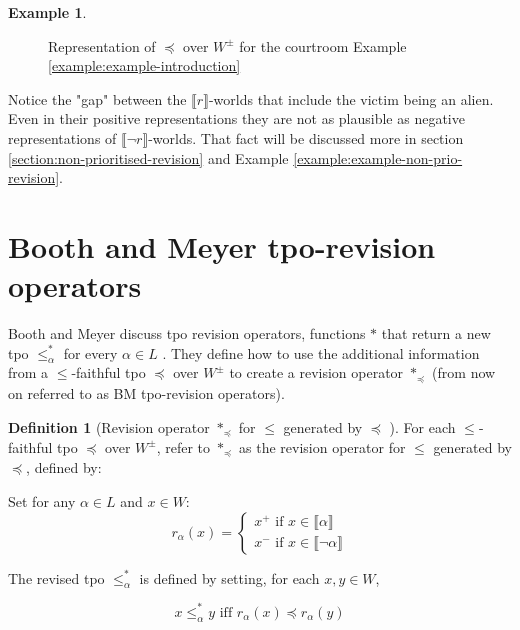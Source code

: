 \documentclass[english, 12pt]{scrartcl}
\theoremstyle{definition}
\newtheorem{example}{Example}
\theoremstyle{definition}
\newtheorem{definition}{Definition}
\theoremstyle{definition}
\newcommand{\modelsOf}[1]{\llbracket #1 \rrbracket}
\begin{document}
\begin{example}
\begin{figure}[H]
            \caption{Representation of $\preceq$ over $W^{\pm}$ for the courtroom Example \ref{example:example-introduction}}
            \label{fig:example-tpo-initial}
    \end{figure}
    
    Notice the "gap" between the $\modelsOf{r}$-worlds that include the victim being an alien. Even in their positive representations they are not as plausible as negative representations of $\modelsOf{\neg r}$-worlds. That fact will be discussed more in section \ref{section:non-prioritised-revision} and Example \ref{example:example-non-prio-revision}.
\end{example}

\section{Booth and Meyer tpo-revision operators}
\label{section:booth-and-meyer-tpo-revision-operators}
Booth and Meyer discuss tpo revision operators, functions $\ast$ that return a new tpo $\leq_{\alpha}^{\ast}$ for every $\alpha \in L$ \cite{Booth2011}. They define how to use the additional information from a $\leq$-faithful tpo $\preceq$ over $W^{\pm}$ to create a revision operator $\ast_{\preceq}$ (from now on referred to as BM tpo-revision operators).

\begin{definition}[Revision operator $\ast_{\preceq}$ for $\leq$ generated by $\preceq$ \cite{Booth2011}]
    \label{definition:revision-operator}
    For each $\leq$-faithful tpo $\preceq$ over $W^{\pm}$, refer to $\ast_{\preceq}$ as the revision operator for $\leq$ generated by $\preceq$, defined by:
    
    Set for any $\alpha \in L$ and $x \in W$:
    \begin{equation*}
        r_{\alpha}(x) = \left\{
                    \begin{array}{ll}
                      x^{+} \textrm{ if } x \in \modelsOf{\alpha}\\
                      x^{-} \textrm{ if } x \in \modelsOf{\neg\alpha}
                    \end{array}
                  \right.
    \end{equation*}
    
    The revised tpo $\leq_{\alpha}^{\ast}$ is defined by setting, for each $x, y \in W$,

    \begin{equation*}
        x \leq_{\alpha}^{\ast} y \textrm{ iff } r_{\alpha}(x) \preceq r_{\alpha}(y)
    \end{equation*}
\end{definition}
\end{document}
